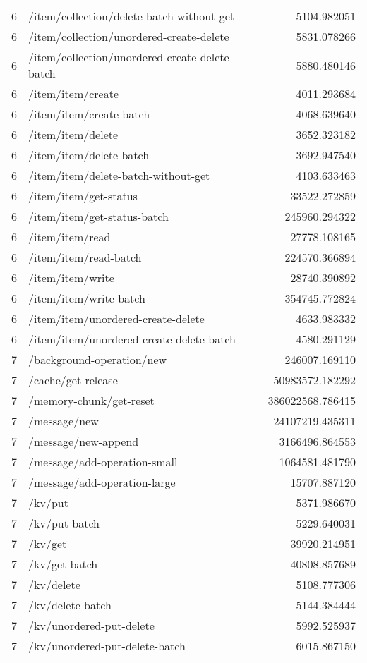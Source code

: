 \begin{longtable}{rlr}
6 & /item/collection/delete-batch-without-get & 5104.982051 \\
6 & /item/collection/unordered-create-delete & 5831.078266 \\
6 & /item/collection/unordered-create-delete-batch & 5880.480146 \\
6 & /item/item/create & 4011.293684 \\
6 & /item/item/create-batch & 4068.639640 \\
6 & /item/item/delete & 3652.323182 \\
6 & /item/item/delete-batch & 3692.947540 \\
6 & /item/item/delete-batch-without-get & 4103.633463 \\
6 & /item/item/get-status & 33522.272859 \\
6 & /item/item/get-status-batch & 245960.294322 \\
6 & /item/item/read & 27778.108165 \\
6 & /item/item/read-batch & 224570.366894 \\
6 & /item/item/write & 28740.390892 \\
6 & /item/item/write-batch & 354745.772824 \\
6 & /item/item/unordered-create-delete & 4633.983332 \\
6 & /item/item/unordered-create-delete-batch & 4580.291129 \\
7 & /background-operation/new & 246007.169110 \\
7 & /cache/get-release & 50983572.182292 \\
7 & /memory-chunk/get-reset & 386022568.786415 \\
7 & /message/new & 24107219.435311 \\
7 & /message/new-append & 3166496.864553 \\
7 & /message/add-operation-small & 1064581.481790 \\
7 & /message/add-operation-large & 15707.887120 \\
7 & /kv/put & 5371.986670 \\
7 & /kv/put-batch & 5229.640031 \\
7 & /kv/get & 39920.214951 \\
7 & /kv/get-batch & 40808.857689 \\
7 & /kv/delete & 5108.777306 \\
7 & /kv/delete-batch & 5144.384444 \\
7 & /kv/unordered-put-delete & 5992.525937 \\
7 & /kv/unordered-put-delete-batch & 6015.867150 \\

\end{longtable}
